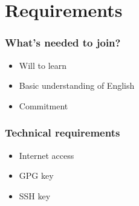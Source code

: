 \section{Requirements}
%
\begin{frame}
\frametitle{What's needed to join?}
%
\begin{itemize}
  \item Will to learn 
  \item Basic understanding of English
  \item Commitment
\end{itemize}
\end{frame}
%
\begin{frame}
\frametitle{Technical requirements}
%
\begin{itemize}
  \item Internet access
  \item GPG key
  \item SSH key
\end{itemize}
\end{frame}
